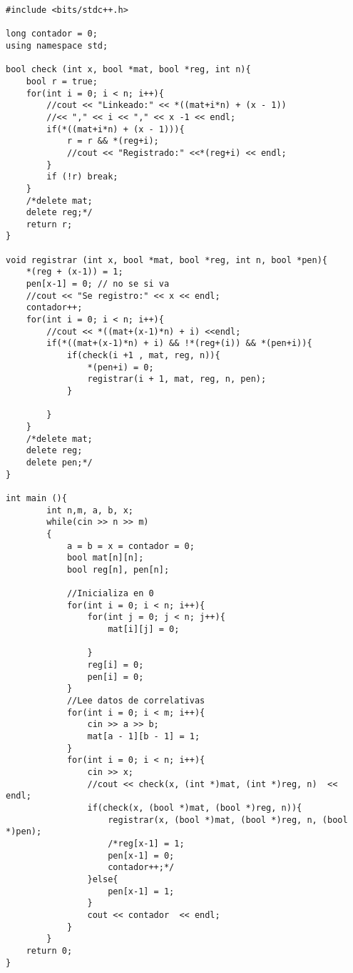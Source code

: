 \begin{verbatim}
#include <bits/stdc++.h>

long contador = 0;
using namespace std;

bool check (int x, bool *mat, bool *reg, int n){
	bool r = true;
	for(int i = 0; i < n; i++){
		//cout << "Linkeado:" << *((mat+i*n) + (x - 1))
		//<< "," << i << "," << x -1 << endl;
		if(*((mat+i*n) + (x - 1))){
			r = r && *(reg+i);
			//cout << "Registrado:" <<*(reg+i) << endl;
		}
		if (!r) break;
	}
	/*delete mat;
	delete reg;*/
	return r;
}

void registrar (int x, bool *mat, bool *reg, int n, bool *pen){
	*(reg + (x-1)) = 1;
	pen[x-1] = 0; // no se si va
	//cout << "Se registro:" << x << endl;
	contador++;
	for(int i = 0; i < n; i++){
		//cout << *((mat+(x-1)*n) + i) <<endl;
		if(*((mat+(x-1)*n) + i) && !*(reg+(i)) && *(pen+i)){
			if(check(i +1 , mat, reg, n)){
				*(pen+i) = 0;
				registrar(i + 1, mat, reg, n, pen);
			}

		}
	}
	/*delete mat;
	delete reg;
	delete pen;*/
}

int main (){
		int n,m, a, b, x;
		while(cin >> n >> m)
		{
			a = b = x = contador = 0;
			bool mat[n][n];
			bool reg[n], pen[n];

			//Inicializa en 0
			for(int i = 0; i < n; i++){
				for(int j = 0; j < n; j++){
					mat[i][j] = 0;

				}
				reg[i] = 0;
				pen[i] = 0;
			}
			//Lee datos de correlativas
			for(int i = 0; i < m; i++){
				cin >> a >> b;
				mat[a - 1][b - 1] = 1;
			}
			for(int i = 0; i < n; i++){
				cin >> x;
				//cout << check(x, (int *)mat, (int *)reg, n)  << endl;
				if(check(x, (bool *)mat, (bool *)reg, n)){
					registrar(x, (bool *)mat, (bool *)reg, n, (bool *)pen);
					/*reg[x-1] = 1;
					pen[x-1] = 0;
					contador++;*/
				}else{
					pen[x-1] = 1;
				}
				cout << contador  << endl;
			}
		}
	return 0;
}

\end{verbatim}

